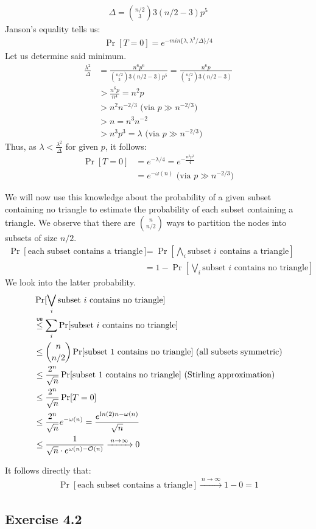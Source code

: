 \documentclass[a4paper,german]{article}
\newcommand\ub{\mathrel{\overset{\makebox[0pt]{\mbox{\normalfont\tiny\sffamily UB}}}{\leq}}}
\begin{document}
\begin{align*}
\Delta = {n/2 \choose 3}3(n/2 -3) p^5
\end{align*}
Janson's equality tells us:
\begin{align*}
\Pr[T = 0] = e^{- min\{\lambda, \lambda^2 / \Delta\} /4} 
\end{align*}
Let us determine said minimum.
\begin{align*}
\frac{\lambda^2}{\Delta} &= \frac{n^6 p^6}{ {n/2 \choose 3}3(n/2 -3) p^5} = \frac{n^6 p}{ {n/2 \choose 3}3(n/2 -3)} \\
&> \frac{n^6p}{n^4} = n^2p \\
&> n^2 n^{-2/3} \text{     (via } p\gg n^{-2/3} \text{)} \\
&> n = n^3 n^{-2} \\
&> n^3 p^3 = \lambda  \text{     (via } p\gg n^{-2/3} \text{)}
\end{align*}
Thus, as \( \lambda < \frac{\lambda^2}{\Delta}\) for given \(p\), it follows:
\begin{align*}
\Pr[T = 0] &= e^{-\lambda/4} = e^{-\frac{n^3p^3}{4}} \\
&= e^{-\omega(n)}    \text{     (via } p\gg n^{-2/3} \text{)}
\end{align*}

We will now use this knowledge about the probability of a given subset containing no triangle to estimate the probability of each subset containing a triangle. We observe that there are \( {n \choose n/2}\) ways to partition the nodes into subsets of size \(n/2\). 
\begin{align*}
\Pr[\text{each subset contains a triangle}] &= \Pr[ \bigwedge_i \text{subset } i \text{ contains a triangle}] \\
&= 1 - \Pr[\bigvee_i \text{subset } i \text{ contains no triangle}]
\end{align*}
We look into the latter probability.
\begin{align*}
&\Pr[\bigvee_i \text{subset } i \text{ contains no triangle}]  \\
&\ub \sum_i \Pr[\text{subset } i \text{ contains no triangle}] \\
&\leq  {n \choose n/2} \Pr[\text{subset } 1 \text{ contains no triangle}] \text{   (all subsets symmetric)} \\
&\leq \frac{2^n}{\sqrt n}  \Pr[\text{subset } 1 \text{ contains no triangle}] \text{   (Stirling approximation)} \\
&\leq \frac{2^n}{\sqrt n}  \Pr[T = 0]\\
&\leq \frac{2^n}{\sqrt n} e^{-\omega(n)} = \frac{e^{ln(2)n - \omega(n)} }{\sqrt n} \\
&\leq \frac{1}{\sqrt n \cdot e^{\omega(n) - \mathcal{O}(n)}} \xrightarrow{\: n \to \infty \: } 0
\end{align*}

It follows directly that:
\begin{align*}
\Pr[\text{each subset contains a triangle}] \xrightarrow{\: n \to \infty \: }  1 - 0 = 1
\end{align*}
\subsection*{Exercise 4.2}
\end{document}
